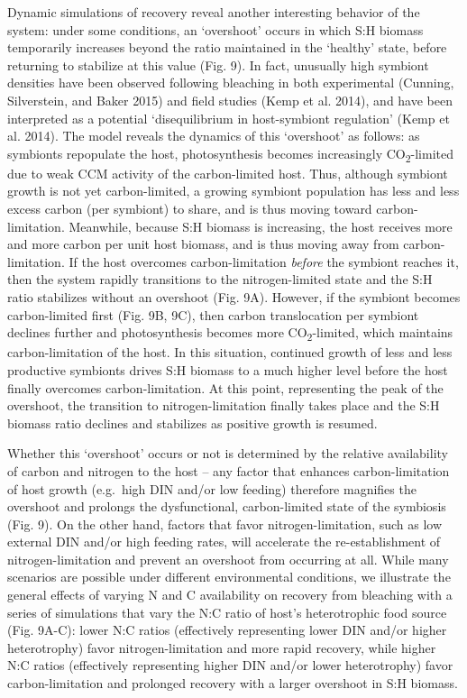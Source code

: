 \documentclass[]{elsarticle} %
\begin{document}
Dynamic simulations of recovery reveal another interesting behavior of
the system: under some conditions, an `overshoot' occurs in which S:H
biomass temporarily increases beyond the ratio maintained in the
`healthy' state, before returning to stabilize at this value (Fig. 9).
In fact, unusually high symbiont densities have been observed following
bleaching in both experimental (Cunning, Silverstein, and Baker 2015)
and field studies (Kemp et al. 2014), and have been interpreted as a
potential `disequilibrium in host-symbiont regulation' (Kemp et al.
2014). The model reveals the dynamics of this `overshoot' as follows: as
symbionts repopulate the host, photosynthesis becomes increasingly
CO\textsubscript{2}-limited due to weak CCM activity of the
carbon-limited host. Thus, although symbiont growth is not yet
carbon-limited, a growing symbiont population has less and less excess
carbon (per symbiont) to share, and is thus moving toward
carbon-limitation. Meanwhile, because S:H biomass is increasing, the
host receives more and more carbon per unit host biomass, and is thus
moving away from carbon-limitation. If the host overcomes
carbon-limitation \emph{before} the symbiont reaches it, then the system
rapidly transitions to the nitrogen-limited state and the S:H ratio
stabilizes without an overshoot (Fig. 9A). However, if the symbiont
becomes carbon-limited first (Fig. 9B, 9C), then carbon translocation
per symbiont declines further and photosynthesis becomes more
CO\textsubscript{2}-limited, which maintains carbon-limitation of the
host. In this situation, continued growth of less and less productive
symbionts drives S:H biomass to a much higher level before the host
finally overcomes carbon-limitation. At this point, representing the
peak of the overshoot, the transition to nitrogen-limitation finally
takes place and the S:H biomass ratio declines and stabilizes as
positive growth is resumed.

Whether this `overshoot' occurs or not is determined by the relative
availability of carbon and nitrogen to the host -- any factor that
enhances carbon-limitation of host growth (e.g.~high DIN and/or low
feeding) therefore magnifies the overshoot and prolongs the
dysfunctional, carbon-limited state of the symbiosis (Fig. 9). On the
other hand, factors that favor nitrogen-limitation, such as low external
DIN and/or high feeding rates, will accelerate the re-establishment of
nitrogen-limitation and prevent an overshoot from occurring at all.
While many scenarios are possible under different environmental
conditions, we illustrate the general effects of varying N and C
availability on recovery from bleaching with a series of simulations
that vary the N:C ratio of host's heterotrophic food source (Fig. 9A-C):
lower N:C ratios (effectively representing lower DIN and/or higher
heterotrophy) favor nitrogen-limitation and more rapid recovery, while
higher N:C ratios (effectively representing higher DIN and/or lower
heterotrophy) favor carbon-limitation and prolonged recovery with a
larger overshoot in S:H biomass.
\end{document}

